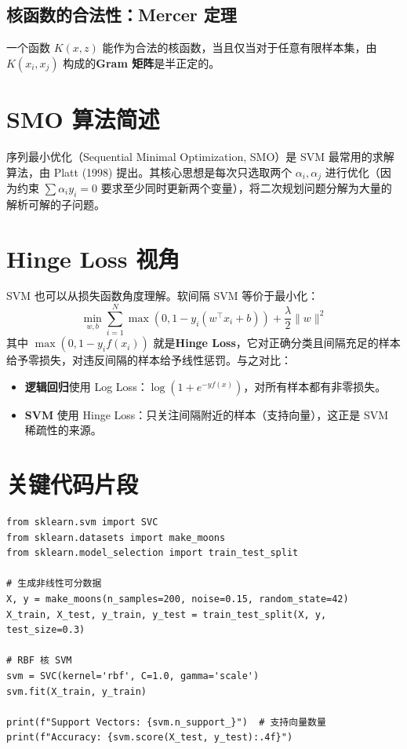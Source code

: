\documentclass[12pt, a4paper]{book}
\begin{document}
\subsection{核函数的合法性：Mercer 定理}
一个函数 $K(x, z)$ 能作为合法的核函数，当且仅当对于任意有限样本集，由 $K(x_i, x_j)$ 构成的\textbf{Gram 矩阵}是半正定的。

\section{SMO 算法简述}
序列最小优化（Sequential Minimal Optimization, SMO）是 SVM 最常用的求解算法，由 Platt (1998) 提出。其核心思想是每次只选取两个 $\alpha_i, \alpha_j$ 进行优化（因为约束 $\sum \alpha_i y_i = 0$ 要求至少同时更新两个变量），将二次规划问题分解为大量的解析可解的子问题。

\section{Hinge Loss 视角}
SVM 也可以从损失函数角度理解。软间隔 SVM 等价于最小化：
$$ \min_{w, b} \sum_{i=1}^N \max(0, 1 - y_i(w^\top x_i + b)) + \frac{\lambda}{2} \|w\|^2 $$
其中 $\max(0, 1 - y_i f(x_i))$ 就是\textbf{Hinge Loss}，它对正确分类且间隔充足的样本给予零损失，对违反间隔的样本给予线性惩罚。与之对比：
\begin{itemize}
    \item \textbf{逻辑回归}使用 Log Loss：$\log(1 + e^{-yf(x)})$，对所有样本都有非零损失。
    \item \textbf{SVM} 使用 Hinge Loss：只关注间隔附近的样本（支持向量），这正是 SVM 稀疏性的来源。
\end{itemize}

\section{关键代码片段}
\begin{lstlisting}
from sklearn.svm import SVC
from sklearn.datasets import make_moons
from sklearn.model_selection import train_test_split

# 生成非线性可分数据
X, y = make_moons(n_samples=200, noise=0.15, random_state=42)
X_train, X_test, y_train, y_test = train_test_split(X, y, test_size=0.3)

# RBF 核 SVM
svm = SVC(kernel='rbf', C=1.0, gamma='scale')
svm.fit(X_train, y_train)

print(f"Support Vectors: {svm.n_support_}")  # 支持向量数量
print(f"Accuracy: {svm.score(X_test, y_test):.4f}")
\end{lstlisting}
\end{document}
